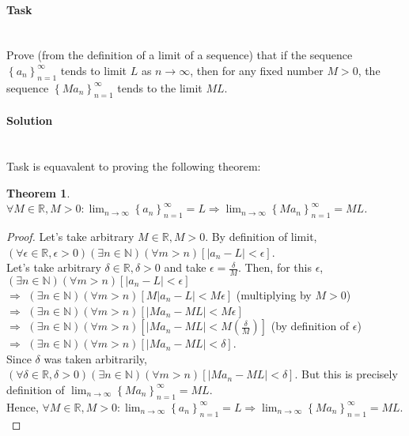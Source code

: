 \documentclass[11pt]{article}
\begin{document}
   \paragraph{Task}\mbox{} \\
      Prove (from the definition of a limit of a sequence) that if the sequence $\left\{a_{n}\right\}_{n=1}^{\infty}$ tends to limit $L$ as $n \rightarrow \infty$,
      then for any fixed number $M > 0$,  the sequence $\left\{Ma_{n}\right\}_{n=1}^{\infty}$ tends to the limit $ML$.
   \paragraph{Solution}\mbox{} \\
   Task is equavalent to proving the following theorem:
   \newtheorem*{Theorem}{Theorem}
   \begin{Theorem}
       $\displaystyle \forall M \in \mathbb{R}, M > 0: \lim_{n \to \infty} \left\{a_{n}\right\}_{n=1}^{\infty} = L  \Rightarrow \lim_{n \to \infty} \left\{Ma_{n}\right\}_{n=1}^{\infty} = ML$.
   \end{Theorem}
   \begin{proof}
   Let's take arbitrary $M \in \mathbb{R}, M > 0$. By definition of limit,\\
   $\left(\forall \epsilon \in \mathbb{R}, \epsilon > 0 \right) \left(\exists n \in \mathbb{N}\right) \left(\forall m > n \right)\left[ \left|a_{n} - L\right| < \epsilon \right]$.\\
   Let's take arbitrary $\delta \in \mathbb{R}, \delta > 0$ and take $\epsilon = \frac{\delta}{M}$.
   Then, for this $\epsilon$, \\
   $\left(\exists n \in \mathbb{N}\right) \left(\forall m > n \right)\left[ \left|a_{n} - L\right| < \epsilon \right]$ \\
   $\Rightarrow$ $\left(\exists n \in \mathbb{N}\right) \left(\forall m > n \right)\left[M \left|a_{n} - L\right| < M\epsilon \right]$ (multiplying by $M > 0$)\\
   $\Rightarrow$ $\left(\exists n \in \mathbb{N}\right) \left(\forall m > n \right)\left[ \left|Ma_{n} - ML\right| < M\epsilon \right]$ \\
   $\Rightarrow$ $\left(\exists n \in \mathbb{N}\right) \left(\forall m > n \right)\left[ \left|Ma_{n} - ML\right| < M\left(\frac{\delta}{M}\right) \right]$ (by definition of $\epsilon$)\\
   $\Rightarrow$ $\left(\exists n \in \mathbb{N}\right) \left(\forall m > n \right)\left[ \left|Ma_{n} - ML\right| < \delta \right]$. \\
   Since $\delta$ was taken arbitrarily, $\left(\forall \delta \in \mathbb{R}, \delta > 0 \right) \left(\exists n \in \mathbb{N}\right) \left(\forall m > n \right)\left[ \left|Ma_{n} - ML\right| < \delta \right].$
   But this is precisely definition of $\displaystyle \lim_{n \to \infty} \left\{Ma_{n} \right\}_{n=1}^{\infty} = ML$.\\
   Hence, $\displaystyle \forall M \in \mathbb{R}, M > 0: \lim_{n \to \infty} \left\{a_{n}\right\}_{n=1}^{\infty} = L  \Rightarrow \lim_{n \to \infty} \left\{Ma_{n}\right\}_{n=1}^{\infty} = ML$.\\
   \end{proof}
\end{document}
